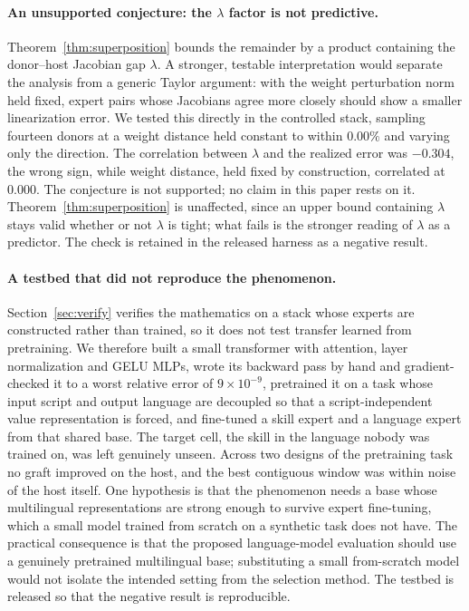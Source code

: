 \documentclass{article}
\theoremstyle{plain}
\theoremstyle{definition}
\theoremstyle{remark}
\begin{document}
\paragraph{An unsupported conjecture: the $\lambda$ factor is not predictive.}
Theorem~\ref{thm:superposition} bounds the remainder by a product containing the
donor--host Jacobian gap $\lambda$. A stronger, testable interpretation would
separate the analysis from a generic Taylor argument: with
the weight perturbation norm held fixed, expert pairs whose Jacobians agree more
closely should show a smaller linearization error. We tested this directly in the
controlled stack, sampling fourteen donors at a weight distance held constant to
within $0.00\%$ and varying only the direction. The correlation between $\lambda$
and the realized error was $-0.304$, the wrong sign, while weight distance, held
fixed by construction, correlated at $0.000$. The conjecture is not supported;
no claim in this paper rests on it. Theorem~\ref{thm:superposition} is unaffected,
since an upper bound containing $\lambda$ stays valid whether or not $\lambda$ is
tight; what fails is the stronger reading of $\lambda$ as a predictor. The check
is retained in the released harness as a negative result.

\paragraph{A testbed that did not reproduce the phenomenon.}
Section~\ref{sec:verify} verifies the mathematics on a stack whose experts are
constructed rather than trained, so it does not test transfer learned from
pretraining. We
therefore built a small transformer with attention, layer normalization and GELU
MLPs, wrote its backward pass by hand and gradient-checked it to a worst relative
error of $9\times10^{-9}$, pretrained it on a task whose input script and output
language are decoupled so that a script-independent value representation is
forced, and fine-tuned a skill expert and a language expert from that shared
base. The target cell, the skill in the language nobody was trained on, was left
genuinely unseen. Across two designs of the pretraining task no graft improved on
the host, and the best contiguous window was within noise of the host itself. One
hypothesis is that the phenomenon needs a base
whose multilingual representations are strong enough to survive expert
fine-tuning, which a small model trained from scratch on a synthetic task does not
have. The practical consequence is that the proposed language-model evaluation
should use a genuinely pretrained multilingual base; substituting a small
from-scratch model would not isolate the intended setting from the selection
method. The testbed is released so that the negative result is reproducible.
\end{document}

